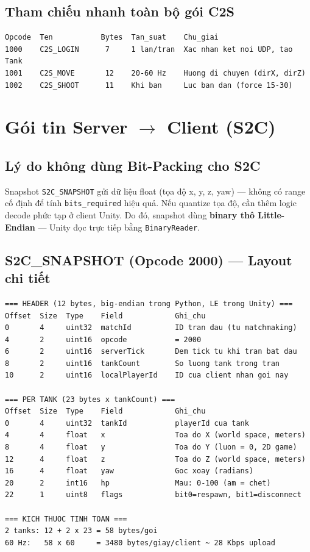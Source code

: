 \documentclass[12pt,a4paper]{report}
\begin{document}
\subsection{Tham chiếu nhanh toàn bộ gói C2S}

\begin{lstlisting}[style=bashStyle, caption={Tóm tắt tất cả gói Client to Server}, label={lst:c2ssummary}]
Opcode  Ten           Bytes  Tan_suat    Chu_giai
1000    C2S_LOGIN      7     1 lan/tran  Xac nhan ket noi UDP, tao Tank
1001    C2S_MOVE       12    20-60 Hz    Huong di chuyen (dirX, dirZ)
1002    C2S_SHOOT      11    Khi ban     Luc ban dan (force 15-30)
\end{lstlisting}

\section{Gói tin Server $\rightarrow$ Client (S2C)}

\subsection{Lý do không dùng Bit-Packing cho S2C}

Snapshot \texttt{S2C\_SNAPSHOT} gửi dữ liệu float (tọa độ x, y, z, yaw) --- không có range cố định để tính \texttt{bits\_required} hiệu quả. Nếu quantize tọa độ, cần thêm logic decode phức tạp ở client Unity. Do đó, snapshot dùng \textbf{binary thô Little-Endian} --- Unity đọc trực tiếp bằng \texttt{BinaryReader}.

\subsection{S2C\_SNAPSHOT (Opcode 2000) --- Layout chi tiết}

\begin{lstlisting}[style=bashStyle, caption={Layout byte-by-byte của S2C\_SNAPSHOT}, label={lst:snapshot}]
=== HEADER (12 bytes, big-endian trong Python, LE trong Unity) ===
Offset  Size  Type    Field            Ghi_chu
0       4     uint32  matchId          ID tran dau (tu matchmaking)
4       2     uint16  opcode           = 2000
6       2     uint16  serverTick       Dem tick tu khi tran bat dau
8       2     uint16  tankCount        So luong tank trong tran
10      2     uint16  localPlayerId    ID cua client nhan goi nay

=== PER TANK (23 bytes x tankCount) ===
Offset  Size  Type    Field            Ghi_chu
0       4     uint32  tankId           playerId cua tank
4       4     float   x                Toa do X (world space, meters)
8       4     float   y                Toa do Y (luon = 0, 2D game)
12      4     float   z                Toa do Z (world space, meters)
16      4     float   yaw              Goc xoay (radians)
20      2     int16   hp               Mau: 0-100 (am = chet)
22      1     uint8   flags            bit0=respawn, bit1=disconnect

=== KICH THUOC TINH TOAN ===
2 tanks: 12 + 2 x 23 = 58 bytes/goi
60 Hz:   58 x 60     = 3480 bytes/giay/client ~ 28 Kbps upload
\end{lstlisting}
\end{document}
